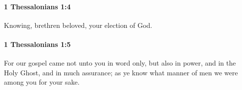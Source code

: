 		\paragraph{1 Thessalonians 1:4} %
			\label{1THESSALONIANS-1-4}

			Knowing, brethren beloved, your election of God.

			\begin{framed}
			\scriptsize
				\begin{compactdesc}
					\item[SBLG] 
				\end{compactdesc}
			\end{framed}

		\paragraph{1 Thessalonians 1:5} %
			\label{1THESSALONIANS-1-5}

			For our gospel came not unto you in word only, but also in power, and in the Holy Ghost, and in much assurance; as ye know what manner of men we were among you for your sake.

